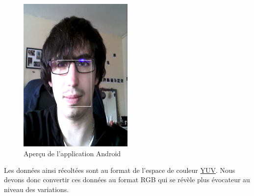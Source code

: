 \begin{figure}[h!]
	\centering
	\includegraphics[width=0.5\textwidth]{data/appAndroid.png}
	\caption{Aperçu de l'application Android}
\end{figure}

Les données ainsi récoltées sont au format de l'espace de couleur \href{http://fr.wikipedia.org/wiki/YUV}{YUV}. Nous devons donc convertir ces données au format RGB qui se révèle plus évocateur au niveau des variations.\\\\

